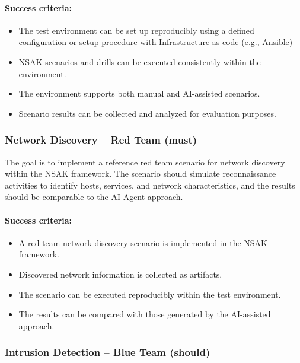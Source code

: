 \paragraph{Success criteria:}

\begin{itemize}
	\item The test environment can be set up reproducibly using a defined configuration or setup procedure with Infrastructure as code (e.g., Ansible)
	\item \gls{NSAK} scenarios and drills can be executed consistently within the environment.
	\item The environment supports both manual and \gls{AI}-assisted scenarios.
	\item Scenario results can be collected and analyzed for evaluation purposes.
\end{itemize}
\newpage

\subsubsection{Network Discovery -- Red Team (must)}\label{subsubsec:network-discovery-red-team}

The goal is to implement a reference red team scenario for network discovery within the \gls{NSAK} framework.
The scenario should simulate reconnaissance activities to identify hosts, services, and network characteristics, and the results should be comparable to the \gls{AI}-Agent approach.

\paragraph{Success criteria:}

\begin{itemize}
	\item A red team network discovery scenario is implemented in the \gls{NSAK} framework.
	\item Discovered network information is collected as artifacts.
	\item The scenario can be executed reproducibly within the test environment.
	\item The results can be compared with those generated by the \gls{AI}-assisted approach.
\end{itemize}

\subsubsection{Intrusion Detection -- Blue Team (should)}\label{subsubsec:intrusion-detection-blue-team}

